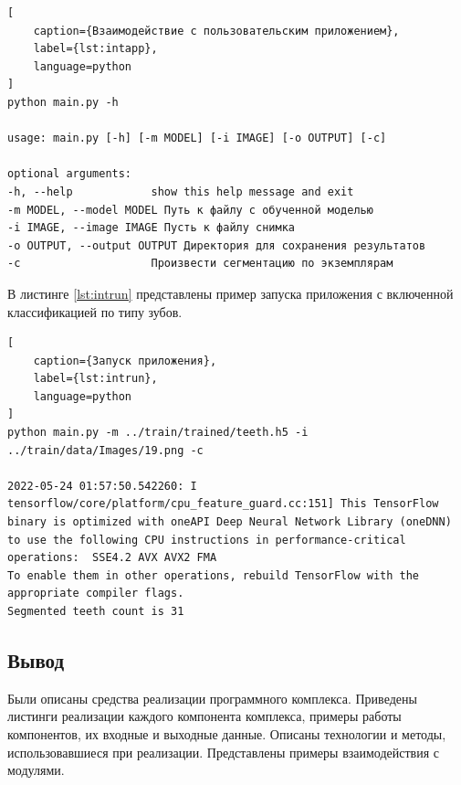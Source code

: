 \begin{lstlisting}[
	caption={Взаимодействие с пользовательским приложением},
	label={lst:intapp},
	language=python
]
python main.py -h

usage: main.py [-h] [-m MODEL] [-i IMAGE] [-o OUTPUT] [-c]

optional arguments:
-h, --help            show this help message and exit
-m MODEL, --model MODEL Путь к файлу с обученной моделью
-i IMAGE, --image IMAGE Пусть к файлу снимка
-o OUTPUT, --output OUTPUT Директория для сохранения результатов
-c                    Произвести сегментацию по экземплярам
\end{lstlisting}

В листинге \ref{lst:intrun} представлены пример запуска приложения с включенной классификацией по типу зубов.

\begin{lstlisting}[
	caption={Запуск приложения},
	label={lst:intrun},
	language=python
]
python main.py -m ../train/trained/teeth.h5 -i ../train/data/Images/19.png -c

2022-05-24 01:57:50.542260: I tensorflow/core/platform/cpu_feature_guard.cc:151] This TensorFlow binary is optimized with oneAPI Deep Neural Network Library (oneDNN) to use the following CPU instructions in performance-critical operations:  SSE4.2 AVX AVX2 FMA
To enable them in other operations, rebuild TensorFlow with the appropriate compiler flags.
Segmented teeth count is 31
\end{lstlisting}

\subsection*{Вывод}

Были описаны средства реализации программного комплекса. Приведены листинги реализации каждого компонента комплекса, примеры работы компонентов, их входные и выходные данные. Описаны технологии и методы, использовавшиеся при реализации. Представлены примеры взаимодействия с модулями.